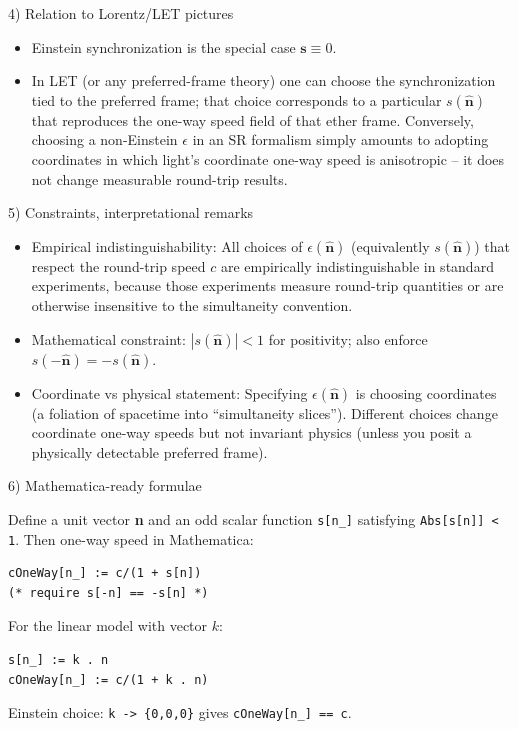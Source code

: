 \documentclass[a4paper]{article}
\theoremstyle{plain}
\theoremstyle{definition}
\newcommand{\vect}[1]{\mathbf{#1}}
\newcommand{\hatvec}[1]{\hat{\mathbf{#1}}}
\begin{document}
4) Relation to Lorentz/LET pictures

\begin{itemize}
\item Einstein synchronization is the special case $\vect{s} \equiv
  0$.
\item In LET (or any preferred-frame theory) one can choose the
  synchronization tied to the preferred frame; that choice corresponds
  to a particular $s(\hatvec{n})$ that reproduces the one-way speed
  field of that ether frame.  Conversely, choosing a non-Einstein
  $\epsilon$ in an SR formalism simply amounts to adopting coordinates
  in which light's coordinate one-way speed is anisotropic -- it does
  not change measurable round-trip results.
\end{itemize}

5) Constraints, interpretational remarks

\begin{itemize}
\item Empirical indistinguishability: All choices of
  $\epsilon(\hatvec{n})$ (equivalently $s(\hatvec{n})$) that respect
  the round-trip speed $c$ are empirically indistinguishable in
  standard experiments, because those experiments measure round-trip
  quantities or are otherwise insensitive to the simultaneity
  convention.
\item Mathematical constraint: $|s(\hatvec{n})| < 1$ for positivity;
  also enforce $s(-\hatvec{n}) = -s(\hatvec{n})$.
\item Coordinate vs physical statement: Specifying
  $\epsilon(\hatvec{n})$ is choosing coordinates (a foliation of
  spacetime into ``simultaneity slices'').  Different choices change
  coordinate one-way speeds but not invariant physics (unless you
  posit a physically detectable preferred frame).
\end{itemize}

6) Mathematica-ready formulae

Define a unit vector \textbf{n} and an odd scalar function
\verb|s[n_]| satisfying \verb|Abs[s[n]] < 1|.  Then one-way
speed in Mathematica:
\begin{verbatim}
cOneWay[n_] := c/(1 + s[n])
(* require s[-n] == -s[n] *)
\end{verbatim}
For the linear model with vector $k$:
\begin{verbatim}
s[n_] := k . n
cOneWay[n_] := c/(1 + k . n)
\end{verbatim}
Einstein choice: \verb|k -> {0,0,0}| gives \verb|cOneWay[n_] == c|.
\end{document}
